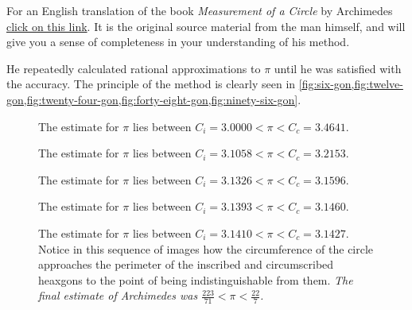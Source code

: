 \documentclass[
  a4paper,
]{article}
\begin{document}
For an English translation of the book \emph{Measurement of a Circle} by
Archimedes \href{auxiliary/Archimedes-Circle.pdf}{click on this link}.
It is the original source material from the man himself, and will give
you a sense of completeness in your understanding of his method.

He repeatedly calculated rational approximations to \(\pi\) until he was
satisfied with the accuracy. The principle of the method is clearly seen
in
\cref{fig:six-gon,fig:twelve-gon,fig:twenty-four-gon,fig:forty-eight-gon,fig:ninety-six-gon}.

\begin{figure}
\centering

\caption{The estimate for \(\pi\) lies between
\(C_i = 3.0000 < \pi < C_c = 3.4641\).}\label{fig:six-gon}
\end{figure}

\begin{figure}
\centering

\caption{The estimate for \(\pi\) lies between
\(C_i = 3.1058 < \pi < C_c = 3.2153\).}\label{fig:twelve-gon}
\end{figure}

\begin{figure}
\centering

\caption{The estimate for \(\pi\) lies between
\(C_i = 3.1326 < \pi < C_c = 3.1596\).}\label{fig:twenty-four-gon}
\end{figure}

\begin{figure}
\centering

\caption{The estimate for \(\pi\) lies between
\(C_i = 3.1393 < \pi < C_c = 3.1460\).}\label{fig:forty-eight-gon}
\end{figure}

\begin{figure}
\centering

\caption{The estimate for \(\pi\) lies between
\(C_i = 3.1410 < \pi < C_c = 3.1427\). Notice in this sequence of images
how the circumference of the circle approaches the perimeter of the
inscribed and circumscribed heaxgons to the point of being
indistinguishable from them. \emph{The final estimate of Archimedes was
\(\frac{223}{71} < \pi < \frac{22}{7}\).}}\label{fig:ninety-six-gon}
\end{figure}
\end{document}
